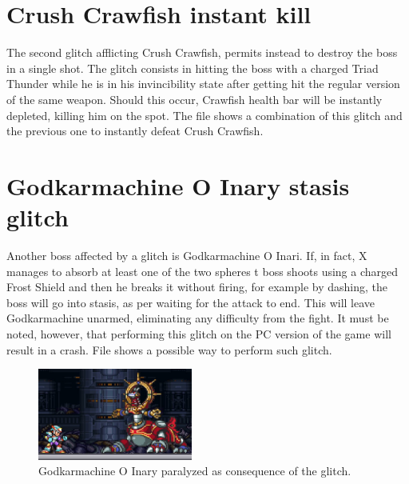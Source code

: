\section{Crush Crawfish instant kill}\label{glitch:Crawfish}
The second glitch afflicting Crush Crawfish, permits instead to destroy the boss in a single shot. The glitch consists in hitting the boss with a charged Triad Thunder while he is in his invincibility state after getting hit the regular version of the same weapon. Should this occur, Crawfish health bar will be instantly depleted, killing him on the spot. The file  shows a combination of this glitch and the previous one to instantly defeat Crush Crawfish.

\section{Godkarmachine O Inary stasis glitch}\label{glitch:Karmachine}
Another boss affected by a glitch is Godkarmachine O Inari. If, in fact, X manages to absorb at least one of the two spheres t boss shoots using a charged Frost Shield and then he breaks it without firing, for example by dashing, the boss will go into stasis, as per waiting for the attack to end. This will leave Godkarmachine unarmed, eliminating any difficulty from the fight. It must be noted, however, that performing this glitch on the PC version of the game will result in a crash. File  shows a possible way to perform such glitch.
\begin{figure}[htp]
	\centering
	\includegraphics[height=3cm]{figures/X3/Doppler_stages/gkarma_stasis.jpg}
	\caption{Godkarmachine O Inary paralyzed as consequence of the glitch.}
\end{figure}